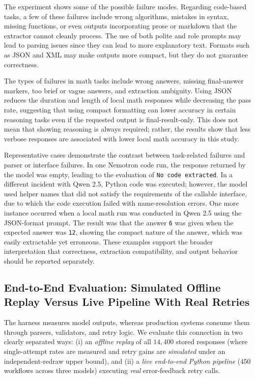 \documentclass[a4paper,fleqn]{cas-sc}
\begin{document}
The experiment shows some of the possible failure modes. Regarding code-based tasks, a few of these failures include wrong algorithms, mistakes in syntax, missing functions, or even outputs incorporating prose or markdown that the extractor cannot cleanly process. The use of both polite and role prompts may lead to parsing issues since they can lead to more explanatory text. Formats such as JSON and XML may make outputs more compact, but they do not guarantee correctness.

The types of failures in math tasks include wrong answers, missing final-answer markers, too brief or vague answers, and extraction ambiguity. Using JSON reduces the duration and length of local math responses while decreasing the pass rate, suggesting that using compact formatting can lower accuracy in certain reasoning tasks even if the requested output is final-result-only. This does not mean that showing reasoning is always required; rather, the results show that less verbose responses are associated with lower local math accuracy in this study.

Representative cases demonstrate the contrast between task-related failures and parser or interface failures. In one Nemotron code run, the response returned by the model was empty, leading to the evaluation of \texttt{No code extracted}. In a different incident with Qwen 2.5, Python code was executed; however, the model used helper names that did not satisfy the requirements of the callable interface, due to which the code execution failed with name-resolution errors. One more instance occurred when a local math run was conducted in Qwen 2.5 using the JSON-format prompt. The result was that the answer \texttt{6} was given when the expected answer was \texttt{12}, showing the compact nature of the answer, which was easily extractable yet erroneous. These examples support the broader interpretation that correctness, extraction compatibility, and output behavior should be reported separately.

\subsection{End-to-End Evaluation: Simulated Offline Replay Versus Live Pipeline With Real Retries}\label{end-to-end-replay}

The harness measures model outputs, whereas production systems consume them through parsers, validators, and retry logic. We evaluate this connection in two clearly separated ways: (i) an \emph{offline replay} of all $14{,}400$ stored responses (where single-attempt rates are measured and retry gains are \emph{simulated} under an independent-redraw upper bound), and (ii) a \emph{live end-to-end Python pipeline} ($450$ workflows across three models) executing \emph{real} error-feedback retry calls.
\end{document}
